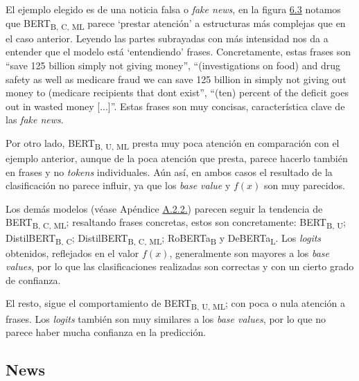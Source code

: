 El ejemplo elegido es de una noticia falsa o \textit{fake news}, en la figura \hyperref[fig:shap-ps-all]{6.3} notamos que {BERT}\textsubscript{B, C, ML} parece `prestar atención' a estructuras más complejas que en el caso anterior. Leyendo las partes subrayadas con más intensidad nos da a entender que el modelo está `entendiendo' frases. Concretamente, estas frases son ``save 125 billion simply not giving money'', ``(investigations on food) and drug safety as well as medicare fraud we can save 125 billion in simply not giving out money to (medicare recipients that dont exist'', ``(ten) percent of the deficit goes out in wasted money [...]''. Estas frases son muy concisas, característica clave de las \textit{fake news}.

Por otro lado, {BERT}\textsubscript{B, U, ML} presta muy poca atención en comparación con el ejemplo anterior, aunque de la poca atención que presta, parece hacerlo también en frases y no \textit{tokens} individuales. Aún así, en ambos casos el resultado de la clasificación no parece influir, ya que los \textit{base value} y $f(x)$ son muy parecidos.

Los demás modelos (véase Apéndice \hyperref[fig:shap-ps-all-annex]{A.2.2.}) parecen seguir la tendencia de {BERT}\textsubscript{B, C, ML}; resaltando frases concretas, estos son concretamente: {BERT}\textsubscript{B, U}; {DistilBERT}\textsubscript{B, C}; {DistilBERT}\textsubscript{B, C, ML}; {RoBERTa}\textsubscript{B} y {DeBERTa}\textsubscript{L}. Los \textit{logits} obtenidos, reflejados en el valor $f(x)$, generalmente son mayores a los \textit{base values}, por lo que las clasificaciones realizadas son correctas y con un cierto grado de confianza.

El resto, sigue el comportamiento de {BERT}\textsubscript{B, U, ML}; con poca o nula atención a frases. Los \textit{logits} también son muy similares a los \textit{base values}, por lo que no parece haber mucha confianza en la predicción.

\subsection{News}

